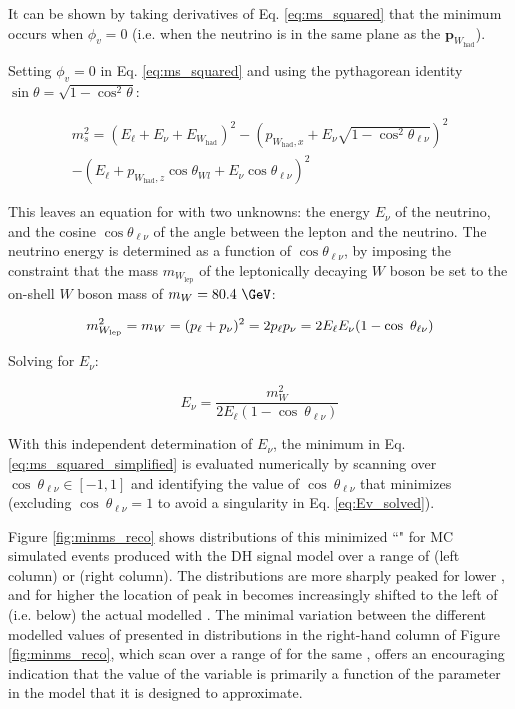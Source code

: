 \noindent It can be shown by taking derivatives of Eq. \ref{eq:ms_squared} that the minimum \ms occurs when \(\phi_v=0\) (i.e. when the neutrino is in the same plane as the \(\mathbf{p}_{W_\text{had}}\)).


Setting \(\phi_v=0\) in Eq. \ref{eq:ms_squared} and using the pythagorean identity \(\sin \theta = \sqrt{1-\cos^2\theta}\):

\begin{multline}
\label{eq:ms_squared_simplified}
m_s^2 = \left(E_\ell + E_\nu + E_{W_\text{had}}\right)^2 - \left(p_{W_\text{had}, x}  + E_\nu\sqrt{1 - \cos^2\theta_{\ell\nu}}\right)^2 \\ - \left(E_\ell + p_{W_\text{had}, z}\cos \theta_{Wl} + E_\nu\cos \theta_{\ell\nu} \right)^2
\end{multline}

This leaves an equation for \ms with two unknowns: the energy \(E_\nu\) of the neutrino, and the cosine \(\cos\theta_{\ell\nu}\) of the angle between the lepton and the neutrino. The neutrino energy is determined as a function of \(\cos\theta_{\ell\nu}\), by imposing the constraint that the mass \(m_{W_\text{lep}}\) of the leptonically decaying \(W\) boson be set to the on-shell \(W\) boson mass of \(m_W=80.4~\GeV\):

\begin{equation}
\label{eq:Ev}
m_{W_\text{lep}}^2 = m_W = (p_\ell + p_{\nu})^2 = 2p_\ell p_{\nu} = 2E_\ell E_{\nu}(1 - \cos\ \theta_{\ell\nu})\\
\end{equation}

\noindent Solving for \(E_\nu\):

\begin{equation}
\label{eq:Ev_solved}
E_{\nu} = \frac{m_W^2}{2E_\ell(1 - \cos\ \theta_{\ell\nu})}
\end{equation}

With this independent determination of \(E_\nu\), the minimum \ms in Eq. \ref{eq:ms_squared_simplified} is evaluated numerically by scanning over \(\cos\ \theta_{\ell\nu} \in [-1,1]\) and identifying the value of \(\cos\ \theta_{\ell\nu}\) that minimizes \ms (excluding \(\cos\ \theta_{\ell\nu}=1\) to avoid a singularity in Eq. \ref{eq:Ev_solved}).

Figure \ref{fig:minms_reco} shows distributions of this minimized ``\minms" for MC simulated events produced with the DH signal model over a range of \ms (left column) or \mZp (right column). The distributions are more sharply peaked for lower \ms, and for higher \ms the location of peak in \minms becomes increasingly shifted to the left of (i.e. below) the actual modelled \ms. The minimal variation between the different modelled values of \mZp presented in distributions in the right-hand column of Figure \ref{fig:minms_reco}, which scan over a range of \mZp for the same \ms, offers an encouraging indication that the value of the \minms variable is primarily a function of the \ms parameter in the model that it is designed to approximate.

